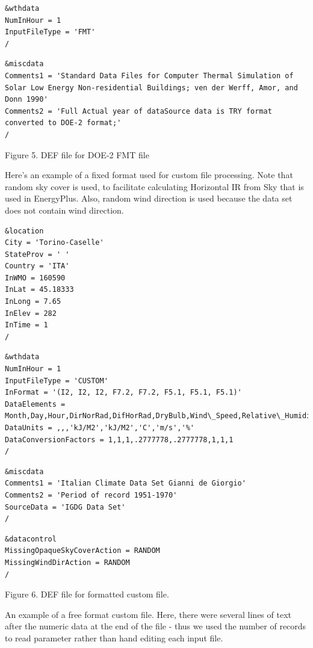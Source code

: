 \begin{lstlisting}
&wthdata
NumInHour = 1
InputFileType = 'FMT'
/
\end{lstlisting}

\begin{lstlisting}
&miscdata
Comments1 = 'Standard Data Files for Computer Thermal Simulation of Solar Low Energy Non-residential Buildings; ven der Werff, Amor, and Donn 1990'
Comments2 = 'Full Actual year of dataSource data is TRY format converted to DOE-2 format;'
/
\end{lstlisting}

Figure 5. DEF file for DOE-2 FMT file

Here's an example of a fixed format used for custom file processing. Note that random sky cover is used, to facilitate calculating Horizontal IR from Sky that is used in EnergyPlus. Also, random wind direction is used because the data set does not contain wind direction.

\begin{lstlisting}
&location
City = 'Torino-Caselle'
StateProv = ' '
Country = 'ITA'
InWMO = 160590
InLat = 45.18333
InLong = 7.65
InElev = 282
InTime = 1
/
\end{lstlisting}

\begin{lstlisting}
&wthdata
NumInHour = 1
InputFileType = 'CUSTOM'
InFormat = '(I2, I2, I2, F7.2, F7.2, F5.1, F5.1, F5.1)'
DataElements = Month,Day,Hour,DirNorRad,DifHorRad,DryBulb,Wind\_Speed,Relative\_Humidity
DataUnits = ,,,'kJ/M2','kJ/M2','C','m/s','%'
DataConversionFactors = 1,1,1,.2777778,.2777778,1,1,1
/
\end{lstlisting}

\begin{lstlisting}
&miscdata
Comments1 = 'Italian Climate Data Set Gianni de Giorgio'
Comments2 = 'Period of record 1951-1970'
SourceData = 'IGDG Data Set'
/
\end{lstlisting}

\begin{lstlisting}
&datacontrol
MissingOpaqueSkyCoverAction = RANDOM
MissingWindDirAction = RANDOM
/
\end{lstlisting}

Figure 6. DEF file for formatted custom file.

An example of a free format custom file. Here, there were several lines of text after the numeric data at the end of the file - thus we used the number of records to read parameter rather than hand editing each input file.

